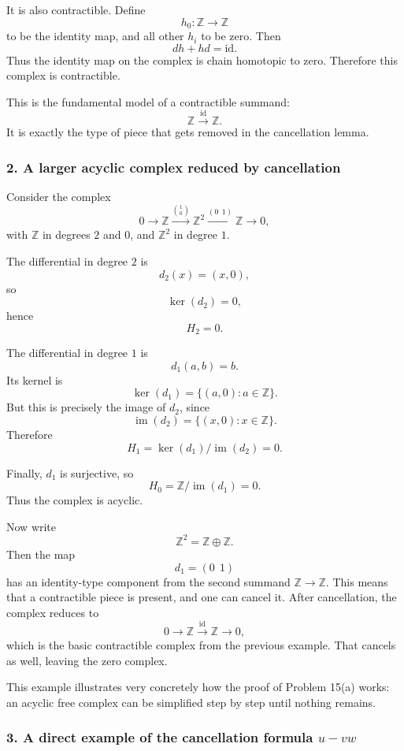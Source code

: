 \documentclass[12pt,a4paper]{article}
\theoremstyle{notespace}
\begin{document}
It is also contractible. Define
\[
h_0:\mathbb Z\to \mathbb Z
\]
to be the identity map, and all other \(h_i\) to be zero. Then
\[
dh+hd=\mathrm{id}.
\]
Thus the identity map on the complex is chain homotopic to zero. Therefore this complex is contractible.

This is the fundamental model of a contractible summand:
\[
\boxed{\mathbb Z \xrightarrow{\mathrm{id}} \mathbb Z.}
\]
It is exactly the type of piece that gets removed in the cancellation lemma.

\subsubsection*{2. A larger acyclic complex reduced by cancellation}

Consider the complex
\[
0 \longrightarrow \mathbb Z \xrightarrow{\binom{1}{0}} \mathbb Z^2 \xrightarrow{(0\ \ 1)} \mathbb Z \longrightarrow 0,
\]
with \(\mathbb Z\) in degrees \(2\) and \(0\), and \(\mathbb Z^2\) in degree \(1\).

The differential in degree \(2\) is
\[
d_2(x)=(x,0),
\]
so
\[
\ker(d_2)=0,
\]
hence
\[
H_2=0.
\]

The differential in degree \(1\) is
\[
d_1(a,b)=b.
\]
Its kernel is
\[
\ker(d_1)=\{(a,0):a\in \mathbb Z\}.
\]
But this is precisely the image of \(d_2\), since
\[
\operatorname{im}(d_2)=\{(x,0):x\in \mathbb Z\}.
\]
Therefore
\[
H_1=\ker(d_1)/\operatorname{im}(d_2)=0.
\]

Finally, \(d_1\) is surjective, so
\[
H_0=\mathbb Z/\operatorname{im}(d_1)=0.
\]
Thus the complex is acyclic.

Now write
\[
\mathbb Z^2=\mathbb Z\oplus \mathbb Z.
\]
Then the map
\[
d_1=(0\ \ 1)
\]
has an identity-type component from the second summand \(\mathbb Z\to \mathbb Z\). This means that a contractible piece is present, and one can cancel it. After cancellation, the complex reduces to
\[
0\longrightarrow \mathbb Z \xrightarrow{\mathrm{id}} \mathbb Z \longrightarrow 0,
\]
which is the basic contractible complex from the previous example. That cancels as well, leaving the zero complex.

This example illustrates very concretely how the proof of Problem 15(a) works: an acyclic free complex can be simplified step by step until nothing remains.

\subsubsection*{3. A direct example of the cancellation formula \(u-vw\)}
\end{document}
